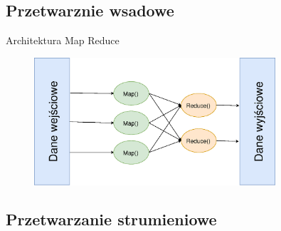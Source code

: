 \subsection{Przetwarznie wsadowe}

Architektura Map Reduce
\begin{figure}[htbp]
\centering
	\includegraphics[width=0.8\textwidth]{img/mr}
\end{figure}

\subsection{Przetwarzanie strumieniowe}
